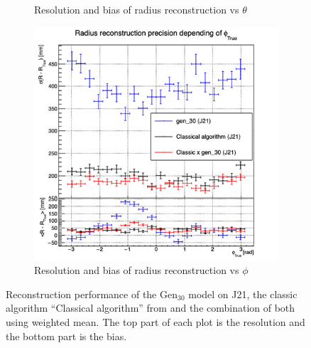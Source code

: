 \documentclass[../main.tex]{subfiles}
\begin{document}
{{\begin{figure}[ht]
\begin{subfigure}[t]{0.32\linewidth}
    \caption{Resolution and bias of radius reconstruction vs $\theta$}
    \label{fig:jcnn:vic_cnn:multi_vic_cnn_Cx30_MSBvTTC}
  \end{subfigure}
  \begin{subfigure}[t]{0.32\linewidth}
    \centering
    \includegraphics[width=\linewidth]{images/jcnn/vic_cnn/multi_vic_cnn_Cx30_MSBvPTC.png}
    \caption{Resolution and bias of radius reconstruction vs $\phi$}
    \label{fig:jcnn:vic_cnn:multi_vic_cnn_Cx30_MSBvPTC}
  \end{subfigure}
  \caption{Reconstruction performance of the $\mathrm{Gen}_{30}$ model on J21, the classic algorithm ``Classical algorithm'' from \cite{lebrin_towards_2022} and the combination of both using weighted mean. The top part of each plot is the resolution and the bottom part is the bias.}

  \label{fig:jcnn:vic_cnn:Cx30}
\end{figure}

}}
\end{document}
